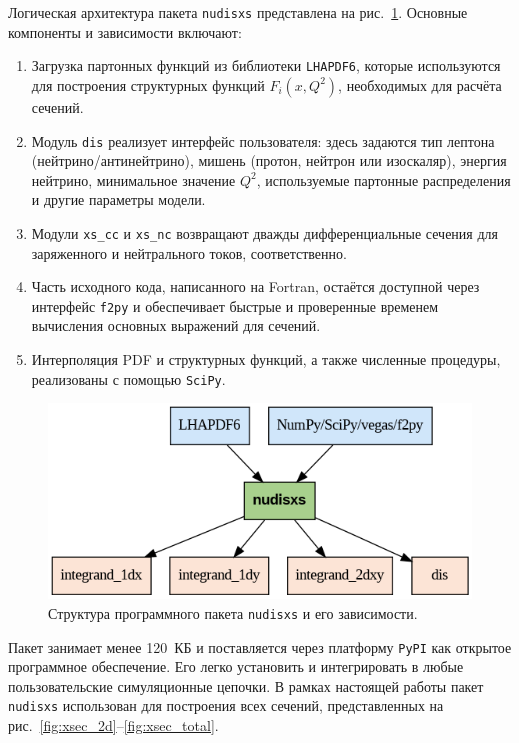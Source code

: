 Логическая архитектура пакета \texttt{nudisxs} представлена на рис.~\ref{fig:nudisxs1}. Основные компоненты и зависимости включают:

\begin{enumerate}
    \item Загрузка партонных функций из библиотеки \texttt{LHAPDF6}, которые используются для построения структурных функций $F_i(x, Q^2)$, необходимых для расчёта сечений.
    
    \item Модуль \texttt{dis} реализует интерфейс пользователя: здесь задаются тип лептона (нейтрино/антинейтрино), мишень (протон, нейтрон или изоскаляр), энергия нейтрино, минимальное значение $Q^2$, используемые партонные распределения и другие параметры модели.
    
    \item Модули \texttt{xs\_cc} и \texttt{xs\_nc} возвращают дважды дифференциальные сечения для заряженного и нейтрального токов, соответственно. 
    
    \item Часть исходного кода, написанного на Fortran, остаётся доступной через интерфейс \texttt{f2py} и обеспечивает быстрые и проверенные временем вычисления основных выражений для сечений.
    
    \item Интерполяция PDF и структурных функций, а также численные процедуры, реализованы с помощью \texttt{SciPy}.
\end{enumerate}

\begin{figure}[!h]
\centering
\includegraphics[width=\linewidth]{images/nudisxs_diagram.png}
\caption{Структура программного пакета \texttt{nudisxs} и его зависимости.}
\label{fig:nudisxs1}
\end{figure}

Пакет занимает менее 120~КБ и поставляется через платформу \texttt{PyPI} как открытое программное обеспечение. Его легко установить и интегрировать в любые пользовательские симуляционные цепочки. В рамках настоящей работы пакет \texttt{nudisxs} использован для построения всех сечений, представленных на рис.~\ref{fig:xsec_2d}–\ref{fig:xsec_total}.


